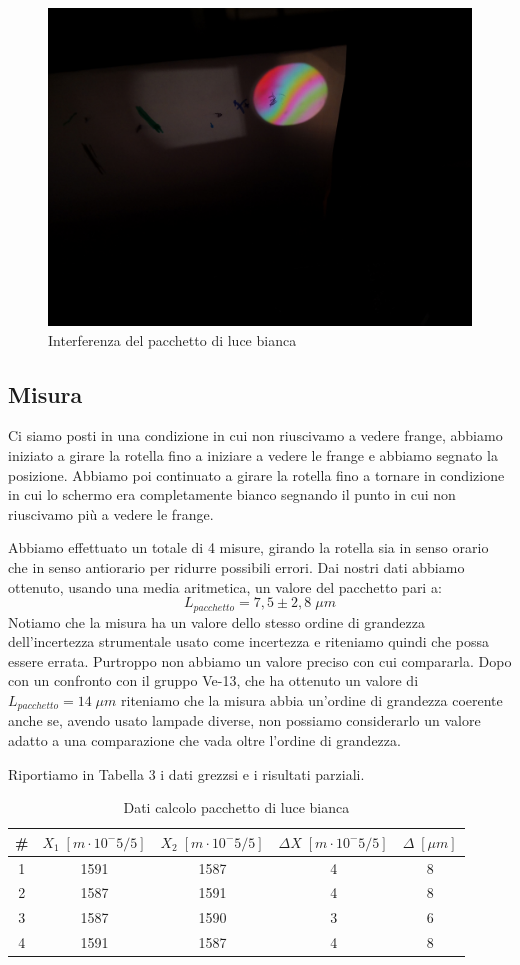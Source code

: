 \documentclass{article}
\begin{document}
\begin{figure}[h!]
  \centering
  \includegraphics[width=0.6\linewidth]{IM pacchetto}
  \caption{Interferenza del pacchetto di luce bianca}
\end{figure}


\subsection{Misura}
Ci siamo posti in una condizione in cui non riuscivamo a vedere frange, abbiamo iniziato a girare la rotella fino a iniziare a vedere le frange e abbiamo segnato la posizione. Abbiamo poi continuato a girare la rotella fino a tornare in condizione in cui lo schermo era completamente bianco segnando il punto in cui non riuscivamo più a vedere le frange.
 
Abbiamo effettuato un totale di 4 misure, girando la rotella sia in senso orario che in senso antiorario per ridurre possibili errori. Dai nostri dati abbiamo ottenuto, usando una media aritmetica, un valore del pacchetto pari a:
\[ L_{pacchetto} = 7,5 \pm 2,8 \; \mu m \]
Notiamo che la misura ha un valore dello stesso ordine di grandezza dell'incertezza strumentale usato come incertezza e riteniamo quindi che possa essere errata. Purtroppo non abbiamo un valore preciso con cui compararla. Dopo con un confronto con il gruppo Ve-13, che ha ottenuto un valore di $L_{pacchetto}=14 \; \mu m$ riteniamo che la misura abbia un'ordine di grandezza coerente anche se, avendo usato lampade diverse, non possiamo considerarlo un valore adatto a una comparazione che vada oltre l'ordine di grandezza.

Riportiamo in Tabella 3 i dati grezzsi e i risultati parziali.


\begin{table}[h!]
\centering
\begin{tabular}{ | c | c | c | c | c | }
\hline
\# & $X_1 \; [m \cdot 10^-5/5]$ & $X_2 \; [m \cdot 10^-5/5]$ & $\Delta X \; [m \cdot 10^-5/5]$ & $\Delta \; [\mu m]$\\
\hline
   1 & 1591 & 1587 & 4 & 8\\
   2 & 1587 & 1591 & 4 & 8\\
   3 & 1587 & 1590 & 3 & 6\\
   4 & 1591 & 1587 & 4 & 8\\
\hline
\end{tabular}
\caption{Dati calcolo pacchetto di luce bianca}
\label{table:3}
\end{table}
\end{document}
